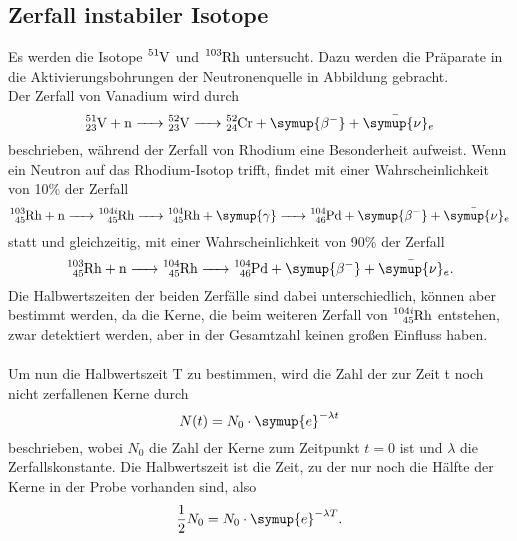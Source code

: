 \subsection{Zerfall instabiler Isotope}

    Es werden die Isotope $\ce{^{51}V}$ und $\ce{^{103}Rh}$ untersucht.
    Dazu werden die Präparate in die Aktivierungsbohrungen der Neutronenquelle in Abbildung %
    gebracht. \\ 
    
    Der Zerfall von Vanadium wird durch
    \begin{equation}
        \ce{^{51}_{23}V + n -> ^{52}_{23}V -> ^{52}_{24}Cr + \symup{\beta^{-}} + \bar{\symup{\nu}}_e}
    \end{equation}
    beschrieben,
    während der Zerfall von Rhodium eine Besonderheit aufweist. 
    Wenn ein Neutron auf das Rhodium-Isotop trifft,
    findet mit einer Wahrscheinlichkeit von 10\% der Zerfall
    \begin{equation}
        \ce{^{103}_{45}Rh + n -> ^{104i}_{45}Rh -> ^{104}_{45}Rh + \symup{\gamma} -> ^{104}_{46}Pd + \symup{\beta^{-}} + \bar{\symup{\nu}}_e}
    \end{equation}
    statt und gleichzeitig,
    mit einer Wahrscheinlichkeit von 90\% der Zerfall
    \begin{equation}
        \ce{^{103}_{45}Rh + n -> ^{104}_{45}Rh -> ^{104}_{46}Pd + \symup{\beta^{-}} + \bar{\symup{\nu}}_e} .
    \end{equation}
    Die Halbwertszeiten der beiden Zerfälle sind dabei unterschiedlich,
    können aber bestimmt werden, 
    da die Kerne, die beim weiteren Zerfall von $\ce{^{104i}_{45}Rh}$ entstehen,
    zwar detektiert werden, aber in der Gesamtzahl keinen großen Einfluss haben.\\
    \\
    Um nun die Halbwertszeit T zu bestimmen, 
    wird die Zahl der zur Zeit t noch nicht zerfallenen Kerne durch
    \begin{equation}
        N(t) = N_0 \cdot \symup{e}^{-\lambda t}
    \end{equation}
    beschrieben,
    wobei $N_0$ die Zahl der Kerne zum Zeitpunkt $t=0$ ist und $\lambda$ die Zerfallskonstante.
    Die Halbwertszeit ist die Zeit,
    zu der nur noch die Hälfte der Kerne in der Probe vorhanden sind,
    also 
    \begin{equation}
        \frac{1}{2} N_0 = N_0 \cdot \symup{e}^{-\lambda T} .
    \end{equation}
